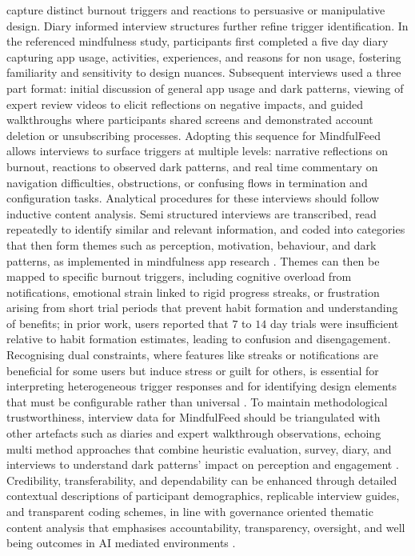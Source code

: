 \documentclass{article}
\begin{document}
capture distinct burnout triggers and reactions to persuasive or manipulative design. Diary informed interview structures further refine trigger identification. In the referenced mindfulness study, participants first completed a five day diary capturing app usage, activities, experiences, and reasons for non usage, fostering familiarity and sensitivity to design nuances. Subsequent interviews used a three part format: initial discussion of general app usage and dark patterns, viewing of expert review videos to elicit reflections on negative impacts, and guided walkthroughs where participants shared screens and demonstrated account deletion or unsubscribing processes. Adopting this sequence for MindfulFeed allows interviews to surface triggers at multiple levels: narrative reflections on burnout, reactions to observed dark patterns, and real time commentary on navigation difficulties, obstructions, or confusing flows in termination and configuration tasks. Analytical procedures for these interviews should follow inductive content analysis. Semi structured interviews are transcribed, read repeatedly to identify similar and relevant information, and coded into categories that then form themes such as perception, motivation, behaviour, and dark patterns, as implemented in mindfulness app research \parencites[5]{7173856}. Themes can then be mapped to specific burnout triggers, including cognitive overload from notifications, emotional strain linked to rigid progress streaks, or frustration arising from short trial periods that prevent habit formation and understanding of benefits; in prior work, users reported that $7$ to $14$ day trials were insufficient relative to habit formation estimates, leading to confusion and disengagement. Recognising dual constraints, where features like streaks or notifications are beneficial for some users but induce stress or guilt for others, is essential for interpreting heterogeneous trigger responses and for identifying design elements that must be configurable rather than universal \parencites[8]{7173856}. To maintain methodological trustworthiness, interview data for MindfulFeed should be triangulated with other artefacts such as diaries and expert walkthrough observations, echoing multi method approaches that combine heuristic evaluation, survey, diary, and interviews to understand dark patterns' impact on perception and engagement \parencites[4]{7173856}. Credibility, transferability, and dependability can be enhanced through detailed contextual descriptions of participant demographics, replicable interview guides, and transparent coding schemes, in line with governance oriented thematic content analysis that emphasises accountability, transparency, oversight, and well being outcomes in AI mediated environments \parencites[8]{7808872}.
\end{document}
